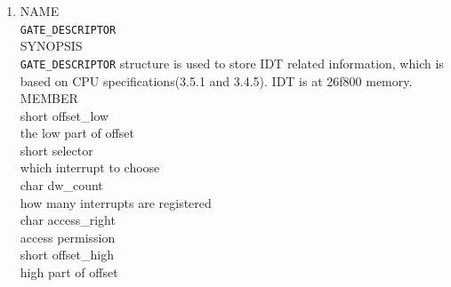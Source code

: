\documentclass{swfcthesis}
\begin{document}
\begin{enumerate}
  \item
  NAME \\
  \hspace*{1cm}\texttt{GATE\_DESCRIPTOR} \\
  SYNOPSIS \\
  \hspace*{1cm} \texttt{GATE\_DESCRIPTOR} structure is used to
store IDT related information, which is based on CPU specifications(3.5.1 and
3.4.5\cite{intel_3a}). IDT is at 26f800 memory.\\
  MEMBER \\
  \hspace*{1cm} short offset\_low\\
  \hspace*{1.5cm}  the low part of offset\\
  \hspace*{1cm} short selector\\
  \hspace*{1.5cm} which interrupt to choose\\
  \hspace*{1cm} char dw\_count\\
  \hspace*{1.5cm} how many interrupts are registered\\
  \hspace*{1cm} char access\_right\\
  \hspace*{1.5cm} access permission\\
  \hspace*{1cm} short  offset\_high\\
  \hspace*{1.5cm} high part of offset\\


\end{enumerate}
\end{document}
